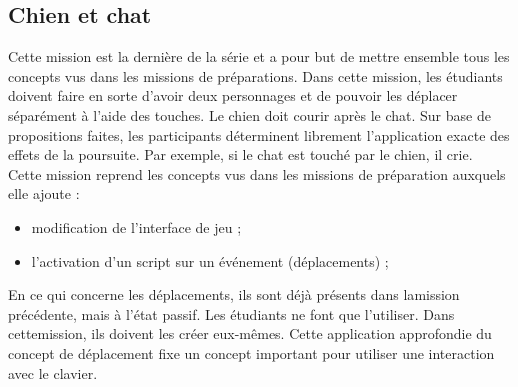 \subsection{Chien et chat}
\label{chien-chat}
Cette \gls{mission} est la dernière de la série et a pour but de mettre ensemble tous les concepts vus dans les \glspl{mission} de préparations. Dans cette \gls{mission}, les étudiants doivent faire en sorte d'avoir deux personnages et de pouvoir les déplacer séparément à l'aide des touches. Le chien doit courir après le chat. Sur base de propositions faites, les participants déterminent librement l'application exacte des effets de la poursuite. Par exemple, si le chat est touché par le chien, il crie.\\

Cette \gls{mission} reprend les concepts vus dans les \glspl{mission} de préparation auxquels elle ajoute :
\begin{itemize}
\item modification de l'interface de jeu ;
\item l'activation d'un \gls{script} sur un événement (déplacements) ;
\end{itemize}

En ce qui concerne les déplacements, ils sont déjà présents dans la\gls{mission} précédente, mais à l'état passif. Les étudiants ne font que l'utiliser. Dans cette\gls{mission}, ils doivent les créer eux-mêmes. Cette application approfondie du concept de déplacement fixe un concept important pour utiliser une interaction avec le clavier.


